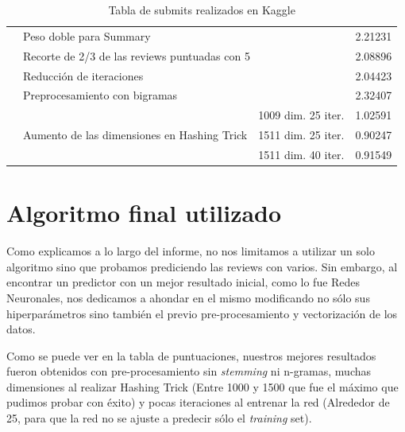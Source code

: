 \documentclass[10pt,a4paper]{article}
\begin{document}
\begin{table}[H]
\begin{tabular}{|l|l|ll|}
                              & \multicolumn{2}{l}{Peso doble para Summary}                                                        & 2.21231                               \\ \cline{2-4} 
                              & \multicolumn{2}{l}{Recorte de 2/3 de las reviews puntuadas con 5}                                  & 2.08896                               \\ \cline{2-4} 
                              & \multicolumn{2}{l}{Reducción de iteraciones}                                                       & 2.04423                               \\ \cline{2-4} 
                              & \multicolumn{2}{l}{Preprocesamiento con bigramas}                                                  & 2.32407                               \\ \cline{2-4} 
                              & \multirow{3}{*}{Aumento de las dimensiones en Hashing Trick} & 1009 dim. 25 iter. & 1.02591                               \\ \cline{3-4}
                              &                                                                  & 1511 dim. 25 iter. & 0.90247                               \\ \cline{3-4} 
                              &                                                                  & 1511 dim. 40 iter. & 0.91549                               \\ \hline
\end{tabular}
\caption{Tabla de submits realizados en Kaggle}
\end{table}

\section{Algoritmo final utilizado}
Como explicamos a lo largo del informe, no nos limitamos a utilizar un solo algoritmo sino que probamos prediciendo las reviews con varios. Sin embargo, al encontrar un predictor con un mejor resultado inicial, como lo fue Redes Neuronales, nos dedicamos a ahondar en el mismo modificando no sólo sus hiperparámetros sino también el previo pre-procesamiento y vectorización de los datos. 

Como se puede ver en la tabla de puntuaciones, nuestros mejores resultados fueron obtenidos con pre-procesamiento sin \textit{stemming} ni n-gramas, muchas dimensiones al realizar Hashing Trick (Entre 1000 y 1500 que fue el máximo que pudimos probar con éxito) y pocas iteraciones al entrenar la red (Alrededor de 25, para que la red no se ajuste a predecir sólo el \textit{training} set). 
\end{document}
